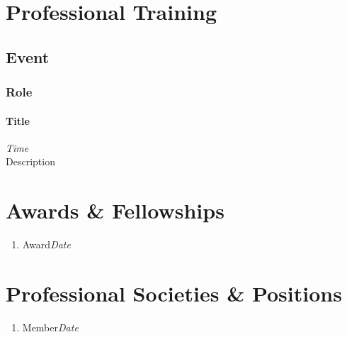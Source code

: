 \documentclass[11pt,letterpaper]{article}
\begin{document}
\section*{Professional Training}
\subsection*{Event}
\subsubsection*{Role}
\paragraph*{Title}\hfill{\textit{Time}}\\
Description


\section*{Awards \& Fellowships}
\begin{enumerate}[leftmargin=*,topsep=0pt,itemsep=-1ex,partopsep=1ex,parsep=1ex,label=(\arabic*)]
    \item[]Award\hfill{\textit{Date}}
\end{enumerate}


\section*{Professional Societies \& Positions}
\begin{enumerate}[leftmargin=*,topsep=0pt,itemsep=-1ex,partopsep=1ex,parsep=1ex,label=(\arabic*)]
    \item[]Member\hfill{\textit{Date}}
\end{enumerate}
\end{document}
